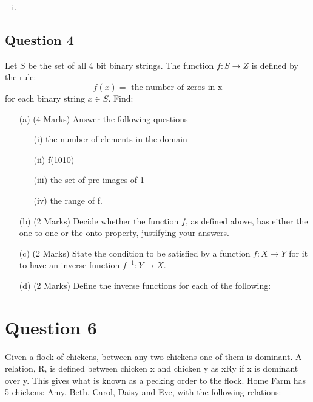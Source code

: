 \documentclass[]{report}
\begin{document}
\begin{itemize}
\begin{enumerate}[(i)]
\item
\end{enumerate}
\subsection*{Question 4}
Let $S$ be the set of all 4 bit binary strings. The function $f : S \rightarrow Z$
is defined by the rule:
\[f(x) = \mbox{ the number of zeros in x} \] for each binary string $x \in S$.
Find:
\begin{itemize}
\item[(a)] (4 Marks) Answer the following questions
\begin{itemize}
\item[(i)] the number of elements in the domain
\item[(ii)] f(1010)
\item[(iii)] the set of pre-images of 1
\item[(iv)] the range of f. 
\end{itemize}
\item[(b)] (2 Marks) Decide whether the function $f$, as defined above, has either the one to one or
the onto property, justifying your answers. 
\item[(c)] (2 Marks) State the condition to be satisfied by a function $f : X \rightarrow Y$ for it to have an
inverse function $f^{-1} : Y \rightarrow X$.
\item[(d)] (2 Marks) Define the inverse functions for each of the following:
\end{itemize}
%
%


\newpage
\section*{Question 6}
Given a flock of chickens, between any two chickens one of them is
dominant. A relation, R, is defined between chicken x and chicken y as xRy if x is
dominant over y. This gives what is known as a pecking order to the flock. Home
Farm has 5 chickens: Amy, Beth, Carol, Daisy and Eve, with the following relations:


\end{itemize}
\end{document}
